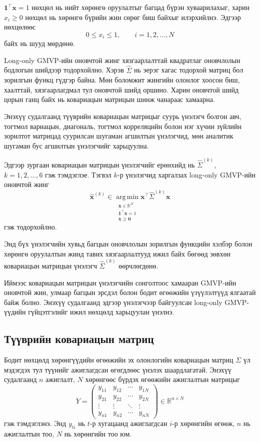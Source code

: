 $\boldsymbol{1}^{\top}\boldsymbol{x}=1$ нөхцөл нь нийт хөрөнгө оруулалтыг багцад бүрэн хуваарилахыг, харин $x_i\geq 0$ нөхцөл нь хөрөнгө бүрийн жин сөрөг биш байхыг илэрхийлнэ. Эдгээр нөхцөлөөс
\[
0\leq x_i\leq 1,\qquad i=1,2,\ldots,N
\]
байх нь шууд мөрдөнө.

Long-only GMVP-ийн оновчтой жинг хязгаарлалттай квадратлаг оновчлолын бодлогын шийдээр тодорхойлно. Хэрэв $\widehat{\Sigma}$ нь эерэг хагас тодорхой матриц бол зорилгын функц гүдгэр байна. Мөн боломжит жингийн олонлог хоосон биш, хаалттай, хязгаарлагдмал тул оновчтой шийд оршино. Харин оновчтой шийд цорын ганц байх нь ковариацын матрицын шинж чанараас хамаарна.

Энэхүү судалгаанд түүврийн ковариацын матрицыг суурь үнэлэгч болгон авч, тогтмол вариацын, диагональ, тогтмол корреляцийн болон нэг хүчин зүйлийн зорилтот матрицад суурилсан шугаман агшилтын үнэлэгчид, мөн аналитик шугаман бус агшилтын үнэлэгчийг харьцуулна.

Эдгээр зургаан ковариацын матрицын үнэлэгчийг ерөнхийд нь
$\widehat{\Sigma}^{(k)}$, $k=1,2,\ldots,6$ гэж тэмдэглэе. Тэгвэл $k$-р үнэлэгчид харгалзах long-only GMVP-ийн оновчтой жинг
\[
\widehat{\boldsymbol{x}}^{(k)}
\in
\underset{
	\substack{
		\boldsymbol{x}\in\mathbb{R}^{N}\\
		\boldsymbol{1}^{\top}\boldsymbol{x}=1\\
		\boldsymbol{x}\geq\boldsymbol{0}
	}
}{\operatorname{arg\,min}}
\boldsymbol{x}^{\top}
\widehat{\Sigma}^{(k)}
\boldsymbol{x}
\]
гэж тодорхойлно.

Энд бүх үнэлэгчийн хувьд багцын оновчлолын зорилгын функцийн хэлбэр болон хөрөнгө оруулалтын жинд тавих хязгаарлалтууд ижил байх бөгөөд зөвхөн ковариацын матрицын үнэлэгч $\widehat{\Sigma}^{(k)}$ өөрчлөгдөнө.

Иймээс ковариацын матрицын үнэлэгчийн сонголтоос хамааран GMVP-ийн оновчтой жин, улмаар багцын эрсдэл болон бодит өгөөжийн үзүүлэлтүүд ялгаатай байж болно. Энэхүү судалгаанд эдгээр үнэлэгчээр байгуулсан long-only GMVP-үүдийн гүйцэтгэлийг ижил нөхцөлд харьцуулан үнэлнэ.





\subsection{Түүврийн ковариацын матриц}

Бодит нөхцөлд хөрөнгүүдийн өгөөжийн эх олонлогийн ковариацын матриц $\Sigma$ үл мэдэгдэх тул түүнийг ажиглагдсан өгөгдлөөс үнэлэх шаардлагатай. Энэхүү судалгаанд $n$ ажиглалт, $N$ хөрөнгөөс бүрдэх өгөөжийн ажиглалтын матрицыг
\[
Y
=
\begin{pmatrix}
	y_{11} & y_{12} & \cdots & y_{1N}\\
	y_{21} & y_{22} & \cdots & y_{2N}\\
	\vdots & \vdots & \ddots & \vdots\\
	y_{n1} & y_{n2} & \cdots & y_{nN}
\end{pmatrix}
\in\mathbb{R}^{n\times N}
\]
гэж тэмдэглэнэ. Энд $y_{ti}$ нь $t$-р хугацаанд ажиглагдсан $i$-р хөрөнгийн өгөөж, $n$ нь ажиглалтын тоо, $N$ нь хөрөнгийн тоо юм.

